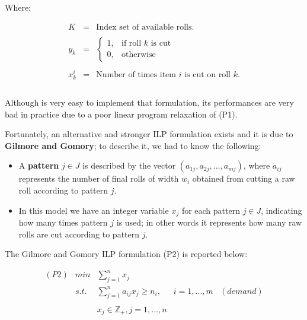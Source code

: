 \documentclass[10pt,a4paper]{article}
\begin{document}
Where:

\begin{equation}
\begin{array} {lllrr} 

K & = & \text{Index set of available rolls.} \\\\
y_k & = & \begin{cases} 1, & \mbox{if roll } k\mbox{ is cut} \\ 0, & \mbox{otherwise} \end{cases} \\\\
x_k^i & = & \text{Number of times item } i \text{ is cut on roll } k. \\\\
\end{array}
\end{equation}

Although is very easy to implement that formulation, its performances are very bad in practice due to a poor linear program relaxation of (P1).

Fortunately, an alternative and stronger ILP formulation exists and it is due to \textbf{Gilmore and Gomory}; to describe it, we had to know the following:

\begin{itemize}
\item A \textbf{pattern} $j \in J$ is described by the vector $(a_{1j},a_{2j},...,a_{mj})$, where $a_{ij}$ represents the number of final rolls of width $w_i$ obtained from cutting a raw roll according to pattern $j$. 

\item In this model we have an integer variable $x_j$ for each pattern $j \in J$, indicating how many times pattern $j$ is used; in other words it represents how many raw rolls are cut according to pattern $j$. 
\end{itemize}

The Gilmore and Gomory ILP formulation (P2) is reported below:

\begin{equation}\label{eqn:P2}
\begin{array} {lllrr} 

(P2) & min & \displaystyle\sum_{j = 1}^{n} x_j && \\
& s.t. & \displaystyle\sum_{j = 1}^{n} a_{ij} x_j \geq n_i, & i = 1,...,m & (demand) \\\\

& & x_j \in \mathbb{Z}_{+}, j = 1,...,n  && \\\\
\end{array}
\end{equation}
\end{document}
